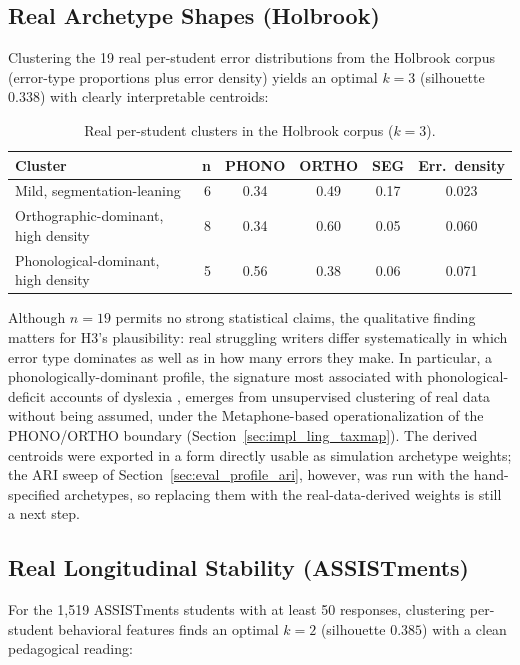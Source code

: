 \subsection{Real Archetype Shapes (Holbrook)}
\label{sec:eval_profile_holbrook}

Clustering the 19 real per-student error distributions from the Holbrook corpus (error-type proportions plus error density) yields an optimal $k=3$ (silhouette $0.338$) with clearly interpretable centroids:

\begin{table}[h]
\centering
\caption{Real per-student clusters in the Holbrook corpus ($k=3$).}
\label{tab:holbrook_clusters}
\begin{tabular}{lrcccc}
\toprule
\textbf{Cluster} & \textbf{n} & \textbf{PHONO} & \textbf{ORTHO} & \textbf{SEG} & \textbf{Err.\ density} \\
\midrule
Mild, segmentation-leaning & 6 & 0.34 & 0.49 & 0.17 & 0.023 \\
Orthographic-dominant, high density & 8 & 0.34 & 0.60 & 0.05 & 0.060 \\
Phonological-dominant, high density & 5 & 0.56 & 0.38 & 0.06 & 0.071 \\
\bottomrule
\end{tabular}
\end{table}

Although $n=19$ permits no strong statistical claims, the qualitative finding matters for H3's plausibility: real struggling writers differ systematically in which error type dominates as well as in how many errors they make. In particular, a phonologically-dominant profile, the signature most associated with phonological-deficit accounts of dyslexia \parencite{ShaywitzShaywitz2005}, emerges from unsupervised clustering of real data without being assumed, under the Metaphone-based operationalization of the PHONO/ORTHO boundary (Section~\ref{sec:impl_ling_taxmap}). The derived centroids were exported in a form directly usable as simulation archetype weights; the ARI sweep of Section~\ref{sec:eval_profile_ari}, however, was run with the hand-specified archetypes, so replacing them with the real-data-derived weights is still a next step.

\subsection{Real Longitudinal Stability (ASSISTments)}
\label{sec:eval_profile_assistments}

For the 1{,}519 ASSISTments students with at least 50 responses, clustering per-student behavioral features finds an optimal $k=2$ (silhouette $0.385$) with a clean pedagogical reading:

